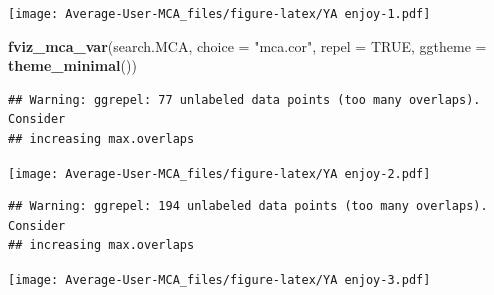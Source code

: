 \documentclass[
]{article}
\newenvironment{Shaded}{\begin{snugshade}}{\end{snugshade}}
\newcommand{\DataTypeTok}[1]{\textcolor[rgb]{0.13,0.29,0.53}{#1}}
\newcommand{\KeywordTok}[1]{\textcolor[rgb]{0.13,0.29,0.53}{\textbf{#1}}}
\newcommand{\NormalTok}[1]{#1}
\newcommand{\OtherTok}[1]{\textcolor[rgb]{0.56,0.35,0.01}{#1}}
\newcommand{\StringTok}[1]{\textcolor[rgb]{0.31,0.60,0.02}{#1}}
\begin{document}
\texttt{[image: Average-User-MCA\_files/figure-latex/YA enjoy-1.pdf]}

\begin{Shaded}
\begin{Highlighting}[]
\KeywordTok{fviz_mca_var}\NormalTok{(search.MCA, }\DataTypeTok{choice =} \StringTok{"mca.cor"}\NormalTok{, }\DataTypeTok{repel =} \OtherTok{TRUE}\NormalTok{,}
             \DataTypeTok{ggtheme =} \KeywordTok{theme_minimal}\NormalTok{())}
\end{Highlighting}
\end{Shaded}

\begin{verbatim}
## Warning: ggrepel: 77 unlabeled data points (too many overlaps). Consider
## increasing max.overlaps
\end{verbatim}

\texttt{[image: Average-User-MCA\_files/figure-latex/YA enjoy-2.pdf]}

\begin{Shaded}
\end{Shaded}

\begin{verbatim}
## Warning: ggrepel: 194 unlabeled data points (too many overlaps). Consider
## increasing max.overlaps
\end{verbatim}

\texttt{[image: Average-User-MCA\_files/figure-latex/YA enjoy-3.pdf]}
\end{document}

